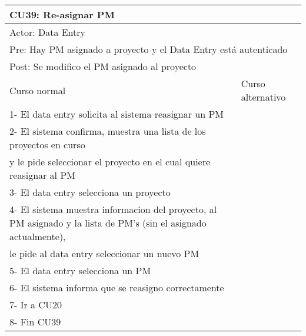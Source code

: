 \begin{table}[H]
  \begin{adjustbox}{max width = \textwidth}
  \begin{tabular}{|l|l|}
    \hline
    \multicolumn{2}{|l|}{CU39: Re-asignar PM} \\\hline
    \multicolumn{2}{|l|}{Actor: Data Entry} \\\hline
    \multicolumn{2}{|l|}{Pre: Hay PM asignado a proyecto y el Data Entry está autenticado} \\\hline
    \multicolumn{2}{|l|}{Post: Se modifico el PM asignado al proyecto} \\\hline
     Curso normal & Curso alternativo\\ \hline
	 1- El data entry solicita al sistema reasignar un PM & \\ \hline
	 2- El sistema confirma, muestra una lista de los proyectos en curso \\ y le pide seleccionar el proyecto en el cual quiere reasignar al PM & \\ \hline
	 3- El data entry selecciona un proyecto & \\ \hline
     4- El sistema muestra informacion del proyecto, al PM asignado y la lista de PM's (sin el asignado actualmente), \\ le pide al data entry seleccionar un nuevo PM & \\ \hline
     5- El data entry selecciona un PM & \\ \hline
	 6- El sistema informa que se reasigno correctamente & \\ \hline
     7- Ir a CU20 & \\ \hline
     8- Fin CU39 & \\ \hline
  \end{tabular}
  \end{adjustbox}
\end{table}


